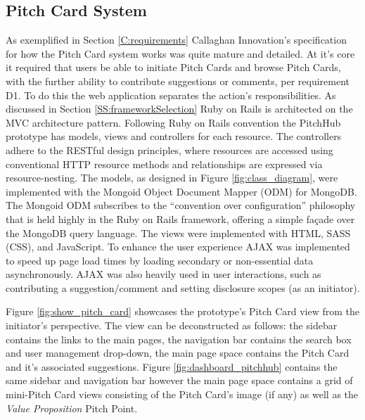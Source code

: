\subsection{Pitch Card System}
As exemplified in Section \ref{C:requirements} Callaghan Innovation's specification for how the Pitch Card system works was quite mature and detailed. At it's core it required that users be able to initiate Pitch Cards and browse Pitch Cards, with the further ability to contribute suggestions or comments, per requirement D1. To do this the web application separates the action's responsibilities. As discussed in Section \ref{SS:frameworkSelection} Ruby on Rails is architected on the MVC architecture pattern. Following Ruby on Rails convention the PitchHub prototype has models, views and controllers for each resource. The controllers adhere to the RESTful design principles, where resources are accessed using conventional HTTP resource methods and relationships are expressed via resource-nesting. The models, as designed in Figure \ref{fig:class_diagram}, were implemented with the Mongoid \cite{Mongo4:online} Object Document Mapper (ODM) for MongoDB. The Mongoid ODM subscribes to the ``convention over configuration'' philosophy that is held highly in the Ruby on Rails framework, offering a simple fa\c{c}ade over the MongoDB query language. The views were implemented with HTML, SASS (CSS), and JavaScript. To enhance the user experience AJAX was implemented to speed up page load times by loading secondary or non-essential data asynchronously. AJAX was also heavily used in user interactions, such as contributing a suggestion/comment and setting disclosure scopes (as an initiator).
\par
Figure \ref{fig:show_pitch_card} showcases the prototype's Pitch Card view from the initiator's perspective. The view can be deconstructed as follows: the sidebar contains the links to the main pages, the navigation bar contains the search box and user management drop-down, the main page space contains the Pitch Card and it's associated suggestions. Figure \ref{fig:dashboard_pitchhub} contains the same sidebar and navigation bar however the main page space contains a grid of mini-Pitch Card views consisting of the Pitch Card's image (if any) as well as the \textit{Value Proposition} Pitch Point.

